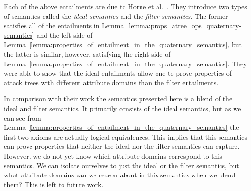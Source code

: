 Each of the above entailments are due to Horne et
al.~\cite{horne2017semantics}.  They introduce two types of semantics
called the \emph{ideal semantics} and the \emph{filter semantics}.
The former satisfies all of the entailments in
Lemma~\ref{lemma:props_atree_ops_quaternary-semantics} and the left
side of
Lemma~\ref{lemma:properties_of_entailment_in_the_quaternary_semantics},
but the latter is similar, however, satisfying the right side of
Lemma~\ref{lemma:properties_of_entailment_in_the_quaternary_semantics}.
They were able to show that the ideal entailments allow one to prove
properties of attack trees with different attribute domains than the
filter entailments.

In comparison with their work the semantics presented here is a blend
of the ideal and filter semantics.  It primarily consists of the ideal
semantics, but as we can see from
Lemma~\ref{lemma:properties_of_entailment_in_the_quaternary_semantics}
the first two axioms are actually logical equivalences. This implies
that this semantics can prove properties that neither the ideal nor the
filter semantics can capture.  However, we do not yet know which
attribute domains correspond to this semantics.  We can isolate
ourselves to just the ideal or the filter semantics, but what
attribute domains can we reason about in this semantics when we blend
them?  This is left to future work.

